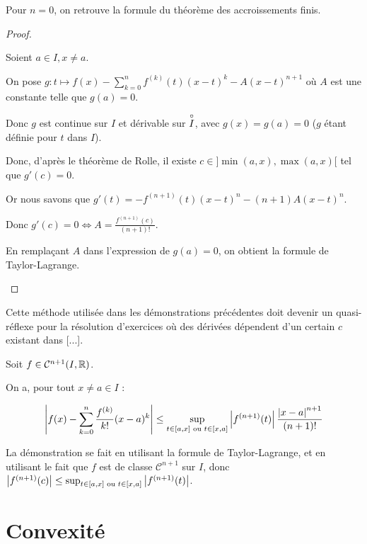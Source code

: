 \documentclass[12pt, a4paper]{report}
\begin{document}
\begin{remark}
    Pour $n=0$, on retrouve la formule du théorème des accroissements finis.
\end{remark}

\begin{proof}
    \begin{outline}
      \1 Soient $a\in I, x\ne a$.

    \1 On pose $g:t\mapsto f(x)-\sum_{k=0}^n f^{(k)}(t)(x-t)^k-A(x-t)^{n+1}$ où $A$ est une constante telle que $g(a)=0$.

    \2 Donc $g$ est continue sur $I$ et dérivable sur $\overset{\circ}{I}$, avec $g(x)=g(a)=0$ ($g$ étant définie pour $t$ dans $I$).

    \2 Donc, d'après le théorème de Rolle, il existe $c \in ]\min(a,x),\max(a,x)[$ tel que $g'(c)=0$.

    \2 Or nous savons que $g'(t)=-f^{(n+1)}(t)(x-t)^n - (n+1)A(x-t)^n$.

    \2 Donc $g'(c)=0 \iff A = \frac{f^{(n+1)}(c)}{(n+1)!}$.

    \1 En remplaçant $A$ dans l'expression de $g(a)=0$, on obtient la formule de Taylor-Lagrange.
    \end{outline}
\end{proof}

Cette méthode utilisée dans les démonstrations précédentes doit devenir un quasi-réflexe pour la résolution d'exercices où des dérivées dépendent d'un certain $c$ existant dans [...].

\begin{consequence}
    Soit $f \in \mathcal{C}^{n+1}(I,\mathbb{R})$. 

    On a, pour tout $x\ne a \in I$ :

    $$\left|f(x)-\sum_{k=0}^n\frac{f^{(k)}}{k!}(x-a)^k\right|\le\sup_{t\in[a,x] \text{ ou }t \in [x,a]}\left|f^{(n+1)}(t)\right|\frac{\left|x-a\right|^{n+1}}{(n+1)!}$$

    La démonstration se fait en utilisant la formule de Taylor-Lagrange, et en utilisant le fait que $f$ est de classe $\mathcal{C}^{n+1}$ sur $I$, donc $\left|f^{(n+1)}(c)\right|\le \sup_{t\in[a,x]\text{ ou } t\in[x,a]}\left|f^{(n+1)}(t)\right|$.
\end{consequence}

\chapter{Convexité}
\end{document}
